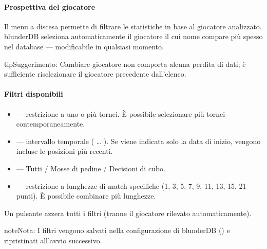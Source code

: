 \documentclass[letterpaper,10pt,italian]{sphinxmanual}
\begin{document}
\paragraph{Prospettiva del giocatore}
\label{\detokenize{manuel:perspective-joueur}}
\sphinxAtStartPar
Il menu a discesa  permette di filtrare le statistiche in base al giocatore analizzato. blunderDB seleziona automaticamente il giocatore il cui nome compare più spesso nel database — modificabile in qualsiasi momento.

\begin{sphinxadmonition}{tip}{Suggerimento:}
\sphinxAtStartPar
Cambiare giocatore non comporta alcuna perdita di dati; è sufficiente riselezionare il giocatore precedente dall’elenco.
\end{sphinxadmonition}


\paragraph{Filtri disponibili}
\label{\detokenize{manuel:filtres-disponibles}}\begin{itemize}
\item {} 
\sphinxAtStartPar
{} — restrizione a uno o più tornei. È possibile selezionare più tornei contemporaneamente.

\item {} 
\sphinxAtStartPar
{} — intervallo temporale ( … ). Se viene indicata solo la data di inizio, vengono incluse le posizioni più recenti.

\item {} 
\sphinxAtStartPar
{} — Tutti / Mosse di pedine / Decisioni di cubo.

\item {} 
\sphinxAtStartPar
{} — restrizione a lunghezze di match specifiche (1, 3, 5, 7, 9, 11, 13, 15, 21 punti). È possibile combinare più lunghezze.

\end{itemize}

\sphinxAtStartPar
Un pulsante  azzera tutti i filtri (tranne il giocatore rilevato automaticamente).

\begin{sphinxadmonition}{note}{Nota:}
\sphinxAtStartPar
I filtri vengono salvati nella configurazione di blunderDB () e ripristinati all’avvio successivo.
\end{sphinxadmonition}
\end{document}
